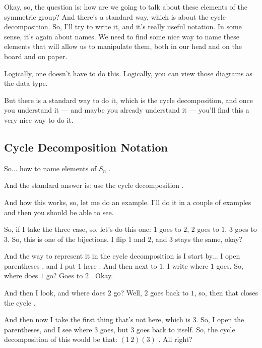 \begin{speech}[01:06:07 - 01:07:01]
Okay, so, the question is: how are we going to talk about these elements of the symmetric group? And there's a standard way, which is about the cycle decomposition. So, I'll try to write it, and it's really useful notation. In some sense, it's again about names. We need to find some nice way to name these elements that will allow us to manipulate them, both in our head and on the board and on paper.

Logically, one doesn't have to do this. Logically, you can view those diagrams as the data type.


But there is a standard way to do it, which is the cycle decomposition, and once you understand it --- and maybe you already understand it --- you'll find this a very nice way to do it.
\end{speech}

\subsection{Cycle Decomposition Notation}

\begin{speech}[01:07:01 - 01:08:35]
So... how to name elements of $S_n$ .

And the standard answer is: use the cycle decomposition .

And how this works, so, let me do an example. I'll do it in a couple of examples and then you should be able to see.

So, if I take the three case, so, let's do this one: $1$ goes to $2$, $2$ goes to $1$, $3$ goes to $3$. So, this is one of the bijections. I flip $1$ and $2$, and $3$ stays the same, okay? 

And the way to represent it in the cycle decomposition is I start by... I open parentheses , and I put $1$ here . And then next to $1$, I write where $1$ goes. So, where does $1$ go? Goes to $2$ . Okay.

And then I look, and where does $2$ go? Well, $2$ goes back to $1$, so, then that closes the cycle .

And then now I take the first thing that's not here, which is $3$. So, I open the parentheses, and I see where $3$ goes, but $3$ goes back to itself. So, the cycle decomposition of this would be that: $(1\,2)(3)$ . All right?
\end{speech}

